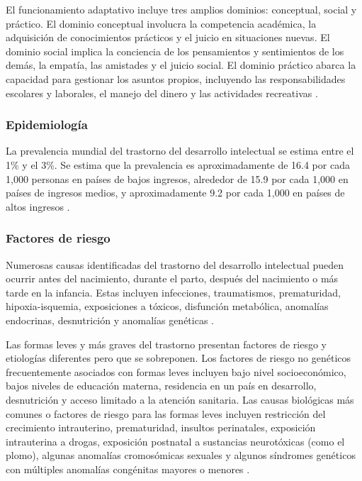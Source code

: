 El funcionamiento adaptativo incluye tres amplios dominios: conceptual, social
y práctico. El dominio conceptual involucra la competencia académica, la
adquisición de conocimientos prácticos y el juicio en situaciones nuevas. El
dominio social implica la conciencia de los pensamientos y sentimientos de los
demás, la empatía, las amistades y el juicio social. El dominio práctico abarca
la capacidad para gestionar los asuntos propios, incluyendo las
responsabilidades escolares y laborales, el manejo del dinero y las
actividades recreativas \cite{Simms2023}.

\subsubsection{Epidemiología}
La prevalencia mundial del trastorno del desarrollo intelectual se estima
entre el 1\% y el 3\%. Se estima que la prevalencia es aproximadamente de 16.4
por cada 1,000 personas en países de bajos ingresos, alrededor de 15.9 por cada
1,000 en países de ingresos medios, y aproximadamente 9.2 por cada 1,000 en
países de altos ingresos \cite{vanKarnebeek2018, Nelson56}.

\subsubsection{Factores de riesgo}
Numerosas causas identificadas del trastorno del desarrollo intelectual pueden
ocurrir antes del nacimiento, durante el parto, después del nacimiento o más 
tarde en la infancia. Estas incluyen infecciones, traumatismos, prematuridad,
hipoxia-isquemia, exposiciones a tóxicos, disfunción metabólica, anomalías
endocrinas, desnutrición y anomalías genéticas \cite{Nelson56}.

Las formas leves y más graves del trastorno presentan factores de riesgo y
etiologías diferentes pero que se sobreponen. Los factores de riesgo no
genéticos frecuentemente asociados con formas leves incluyen bajo nivel
socioeconómico, bajos niveles de educación materna, residencia en un país en
desarrollo, desnutrición y acceso limitado a la atención sanitaria. Las causas
biológicas más comunes o factores de riesgo para las formas leves incluyen
restricción del crecimiento intrauterino, prematuridad, insultos perinatales,
exposición intrauterina a drogas, exposición postnatal a sustancias
neurotóxicas (como el plomo), algunas anomalías cromosómicas sexuales y algunos
síndromes genéticos con múltiples anomalías congénitas mayores o menores
\cite{Nelson56}.

